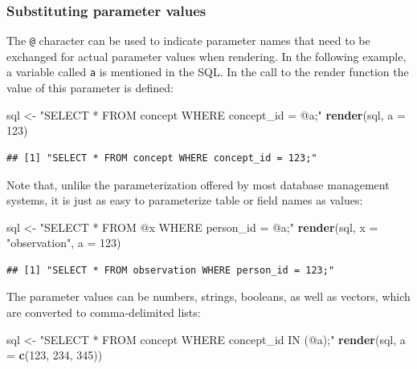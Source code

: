 \documentclass[11pt]{book}
\newenvironment{Shaded}{\begin{snugshade}}{\end{snugshade}}
\newcommand{\DataTypeTok}[1]{\textcolor[rgb]{0.13,0.29,0.53}{#1}}
\newcommand{\DecValTok}[1]{\textcolor[rgb]{0.00,0.00,0.81}{#1}}
\newcommand{\KeywordTok}[1]{\textcolor[rgb]{0.13,0.29,0.53}{\textbf{#1}}}
\newcommand{\NormalTok}[1]{#1}
\newcommand{\StringTok}[1]{\textcolor[rgb]{0.31,0.60,0.02}{#1}}
\theoremstyle{definition}
\theoremstyle{definition}
\theoremstyle{definition}
\theoremstyle{remark}
\begin{document}
\hypertarget{substituting-parameter-values}{%
\subsubsection*{Substituting parameter values}\label{substituting-parameter-values}}

The \texttt{@} character can be used to indicate parameter names that need to be exchanged for actual parameter values when rendering. In the following example, a variable called \texttt{a} is mentioned in the SQL. In the call to the render function the value of this parameter is defined:

\begin{Shaded}
\begin{Highlighting}[]
\NormalTok{sql <-}\StringTok{ "SELECT * FROM concept WHERE concept_id = @a;"}
\KeywordTok{render}\NormalTok{(sql, }\DataTypeTok{a =} \DecValTok{123}\NormalTok{)}
\end{Highlighting}
\end{Shaded}

\begin{verbatim}
## [1] "SELECT * FROM concept WHERE concept_id = 123;"
\end{verbatim}

Note that, unlike the parameterization offered by most database management systems, it is just as easy to parameterize table or field names as values:

\begin{Shaded}
\begin{Highlighting}[]
\NormalTok{sql <-}\StringTok{ "SELECT * FROM @x WHERE person_id = @a;"}
\KeywordTok{render}\NormalTok{(sql, }\DataTypeTok{x =} \StringTok{"observation"}\NormalTok{, }\DataTypeTok{a =} \DecValTok{123}\NormalTok{)}
\end{Highlighting}
\end{Shaded}

\begin{verbatim}
## [1] "SELECT * FROM observation WHERE person_id = 123;"
\end{verbatim}

The parameter values can be numbers, strings, booleans, as well as vectors, which are converted to comma-delimited lists:

\begin{Shaded}
\begin{Highlighting}[]
\NormalTok{sql <-}\StringTok{ "SELECT * FROM concept WHERE concept_id IN (@a);"}
\KeywordTok{render}\NormalTok{(sql, }\DataTypeTok{a =} \KeywordTok{c}\NormalTok{(}\DecValTok{123}\NormalTok{, }\DecValTok{234}\NormalTok{, }\DecValTok{345}\NormalTok{))}
\end{Highlighting}
\end{Shaded}
\end{document}
